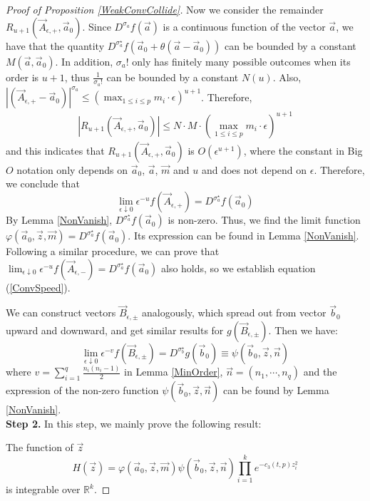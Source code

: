 \begin{proof}[Proof of Proposition \ref{WeakConvCollide}]
Now we consider the remainder $R_{u+1}(\vec{A}_{\epsilon,+},\vec{a}_{0})$. Since $D^{\sigma_{a}}f(\vec{a})$ is a continuous function of the vector $\vec{a}$, we have that the quantity $D^{\sigma_{a}^{\star}}f(\vec{a}_{0}+\theta(\vec{a}-\vec{a}_{0}))$ can be bounded by a constant $M(\vec{a},\vec{a}_{0})$. In addition, $\sigma_{a}!$ only has finitely many possible outcomes when its order is $u+1$, thus $\frac{1}{\sigma_{a}!}$ can be bounded by a constant $N(u)$. Also, $|(\vec{A}_{\epsilon,+}-\vec{a}_{0})|^{\sigma_{a}}\leqslant (\max_{1\leqslant i\leqslant p}m_{i}\cdot \epsilon)^{u+1}$. Therefore,
\begin{align*}
	|R_{u+1}(\vec{A}_{\epsilon,+},\vec{a}_{0})|\leqslant N\cdot M \cdot (\max_{1\leqslant i\leqslant p}m_{i}\cdot \epsilon)^{u+1}
\end{align*}
and this indicates that $R_{u+1}(\vec{A}_{\epsilon,+},\vec{a}_{0})$ is $O(\epsilon^{u+1})$, where the constant in Big $O$ notation only depends on $\vec{a}_{0}$, $\vec{a}$, $\vec{m}$ and $u$ and does not depend on $\epsilon$. Therefore, we conclude that 
$$\lim_{\epsilon\downarrow 0}\epsilon^{-u}f(\vec{A}_{\epsilon,+})=D^{\sigma_{a}^{\star}}f(\vec{a}_{0})$$
By Lemma \ref{NonVanish}, $D^{\sigma_{a}^{\star}}f(\vec{a}_{0})$ is non-zero. Thus, we find the limit function $\varphi(\vec{a}_{0},\vec{z},\vec{m})=D^{\sigma_{a}^{\star}}f(\vec{a}_{0})$. Its expression can be found in Lemma \ref{NonVanish}. Following a similar procedure, we can prove that $\lim_{\epsilon\downarrow 0}\epsilon^{-u}f(\vec{A}_{\epsilon,-})=D^{\sigma_{a}^{\star}}f(\vec{a}_{0})$ also holds, so we establish equation (\ref{ConvSpeed}).

We can construct vectors $\vec{B}_{\epsilon,\pm}$ analogously, which spread out from vector $\vec{b}_{0}$ upward and downward, and get similar results for $g(\vec{B}_{\epsilon,\pm})$. Then we have:
$$\lim_{\epsilon\downarrow 0}\epsilon^{-v}f(\vec{B}_{\epsilon,\pm})=D^{\sigma_{b}^{\star}}g(\vec{b}_{0})\equiv\psi(\vec{b}_{0},\vec{z},\vec{n})$$
where $v=\sum_{i=1}^{q}\frac{n_{i}(n_{i}-1)}{2}$ in Lemma \ref{MinOrder}, $\vec{n}=(n_{1},\cdots,n_{q})$ and the expression of the non-zero function $\psi(\vec{b}_{0},\vec{z},\vec{n})$ can be found by Lemma \ref{NonVanish}.\\
\textbf{Step 2. }In this step, we mainly prove the following result:

The function of $\vec{z}$ $$H(\vec{z})=\varphi(\vec{a}_{0},\vec{z},\vec{m})\psi(\vec{b}_{0},\vec{z},\vec{n})\prod_{i=1}^{k}e^{-c_{3}(t,p)z_{i}^{2}}$$ is integrable over $\mathbb{R}^{k}$.


\end{proof}
